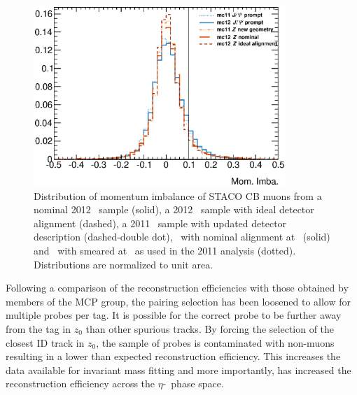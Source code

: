 \begin{figure}[htbp]
  \centering
    \includegraphics[width=0.85\textwidth]{PartCalibration2012/Plots/FixingMomImba/h_muon_momImba.eps}
    \caption{Distribution of momentum imbalance of STACO CB muons from a nominal 2012 \ZMu\ sample (solid), a 2012 \ZMu\ sample with ideal detector alignment (dashed), a 2011 \ZMu\ sample with updated detector description (dashed-double dot), \JMu\ with nominal alignment at \cmsE\ (solid) and \JMu\ with smeared at \cmsS\ as used in the 2011 analysis (dotted). Distributions are normalized to unit area.}\label{fig:CalibrationMomImba}
\end{figure}

Following a comparison of the reconstruction efficiencies with those obtained by members of the MCP group, the pairing selection has been loosened to allow for multiple probes per tag. It is possible for the correct probe to be further away from the tag in $z_0$ than other spurious tracks. By forcing the selection of the closest ID track in $z_0$, the sample of probes is contaminated with non-muons resulting in a lower than expected reconstruction efficiency. This increases the data available for invariant mass fitting and more importantly, has increased the reconstruction efficiency across the $\eta$-\pt\ phase space.
